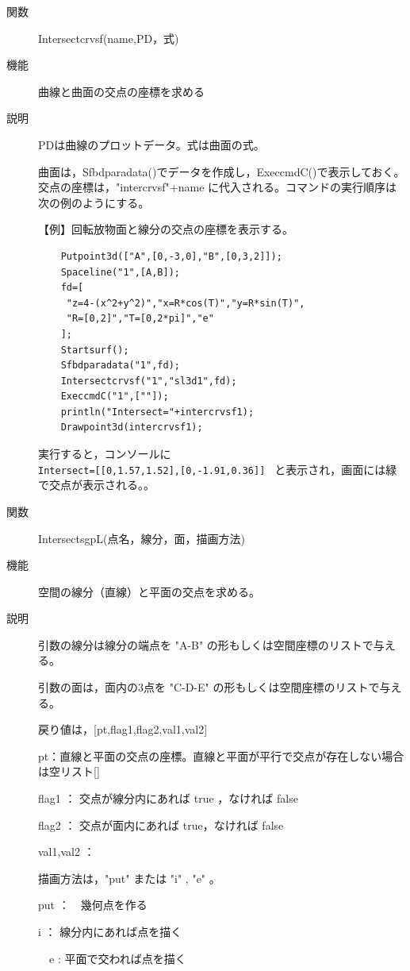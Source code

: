 \documentclass[papersize,a4paper,12pt,uplatex]{jsarticle}
\begin{document}
\begin{description}
\hypertarget{intersectcrvsf}{}
\item[関数]  Intersectcrvsf(name,PD，式)
\item[機能]  曲線と曲面の交点の座標を求める
\item[説明]  PDは曲線のプロットデータ。式は曲面の式。

  曲面は，Sfbdparadata()でデータを作成し，ExeccmdC()で表示しておく。交点の座標は，"intercrvsf"+name に代入される。コマンドの実行順序は次の例のようにする。

\vspace{\baselineskip}
【例】回転放物面と線分の交点の座標を表示する。
\begin{verbatim}
    Putpoint3d(["A",[0,-3,0],"B",[0,3,2]]);
    Spaceline("1",[A,B]);
    fd=[
     "z=4-(x^2+y^2)","x=R*cos(T)","y=R*sin(T)",
     "R=[0,2]","T=[0,2*pi]","e"
    ];
    Startsurf();
    Sfbdparadata("1",fd);
    Intersectcrvsf("1","sl3d1",fd);
    ExeccmdC("1",[""]);
    println("Intersect="+intercrvsf1);
    Drawpoint3d(intercrvsf1); 
\end{verbatim}
実行すると，コンソールに\\
    \verb|Intersect=[[0,1.57,1.52],[0,-1.91,0.36]] |
と表示され，画面には緑で交点が表示される。。


\vspace{\baselineskip}
\hypertarget{intersectsgpL}{}
\item[関数]  IntersectsgpL(点名，線分，面，描画方法)
\item[機能]  空間の線分（直線）と平面の交点を求める。
\item[説明]  引数の線分は線分の端点を "A-B" の形もしくは空間座標のリストで与える。

  引数の面は，面内の3点を "C-D-E" の形もしくは空間座標のリストで与える。

  戻り値は，[pt,flag1,flag2,val1,val2]
  
  pt：直線と平面の交点の座標。直線と平面が平行で交点が存在しない場合は空リスト[]
  
  flag1 ： 交点が線分内にあれば true ，なければ false
  
  flag2 ： 交点が面内にあれば true，なければ false
  
  val1,val2 ： 
  
  描画方法は，"put" または "i" , "e" 。
  
  put ：　幾何点を作る

   i ： 線分内にあれば点を描く

　e :  平面で交われば点を描く
  

\end{description}
\end{document}
